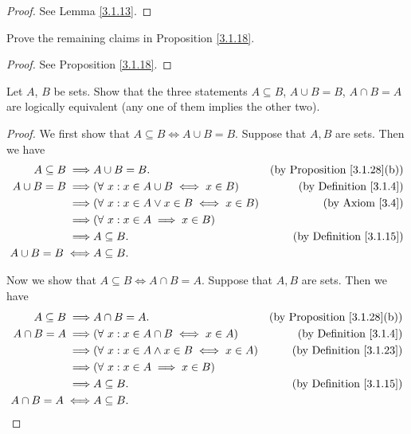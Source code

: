 \begin{proof}
See Lemma \ref{3.1.13}.
\end{proof}

\begin{exercise}\label{ex 3.1.4}
Prove the remaining claims in Proposition \ref{3.1.18}.
\end{exercise}

\begin{proof}
See Proposition \ref{3.1.18}.
\end{proof}

\begin{exercise}\label{ex 3.1.5}
Let \(A\), \(B\) be sets.
Show that the three statements \(A \subseteq B\), \(A \cup B = B\), \(A \cap B = A\) are logically equivalent (any one of them implies the other two).
\end{exercise}

\begin{proof}
We first show that \(A \subseteq B \iff A \cup B = B\).
Suppose that \(A, B\) are sets.
Then we have
\begin{align*}
A \subseteq B \implies & A \cup B = B. & \text{(by Proposition \ref{3.1.28}(b))} \\
A \cup B = B \implies & (\forall\ x : x \in A \cup B \iff x \in B) & \text{(by Definition \ref{3.1.4})} \\
\implies & (\forall\ x : x \in A \lor x \in B \iff x \in B) & \text{(by Axiom \ref{3.4})} \\
\implies & (\forall\ x : x \in A \implies x \in B) \\
\implies & A \subseteq B. & \text{(by Definition \ref{3.1.15})} \\
A \cup B = B \iff & A \subseteq B.
\end{align*}

Now we show that \(A \subseteq B \iff A \cap B = A\).
Suppose that \(A, B\) are sets.
Then we have
\begin{align*}
A \subseteq B \implies & A \cap B = A. & \text{(by Proposition \ref{3.1.28}(b))} \\
A \cap B = A \implies & (\forall\ x : x \in A \cap B \iff x \in A) & \text{(by Definition \ref{3.1.4})} \\
\implies & (\forall\ x : x \in A \land x \in B \iff x \in A) & \text{(by Definition \ref{3.1.23})} \\
\implies & (\forall\ x : x \in A \implies x \in B) \\
\implies & A \subseteq B. & \text{(by Definition \ref{3.1.15})} \\
A \cap B = A \iff & A \subseteq B.
\end{align*}
\end{proof}

